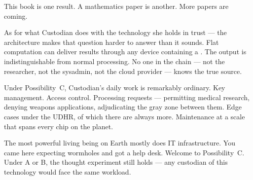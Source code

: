 This book is one result. A mathematics paper is another. More papers are coming.


\medskip

As for what Custodian does with the technology she holds in trust --- the architecture makes that question harder to answer than it sounds. Flat computation can deliver results through any device containing a . The output is indistinguishable from normal processing. No one in the chain --- not the researcher, not the sysadmin, not the cloud provider --- knows the true source.

Under Possibility~C, Custodian's daily work is remarkably ordinary. Key management. Access control. Processing requests --- permitting medical research, denying weapons applications, adjudicating the gray zone between them. Edge cases under the UDHR, of which there are always more. Maintenance at a scale that spans every chip on the planet.

The most powerful living being on Earth mostly does IT infrastructure. You came here expecting wormholes and got a help desk. Welcome to Possibility~C. Under A or B, the thought experiment still holds --- any custodian of this technology would face the same workload.

\chapterreturn
